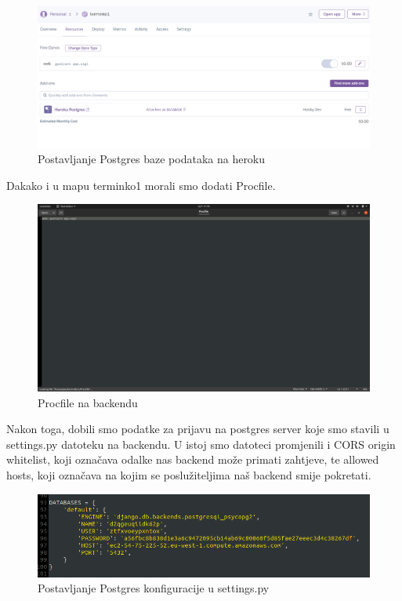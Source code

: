 			\begin{figure}[H]
				\centering
				\includegraphics[scale=0.50]{slike/Postgres.PNG}
				\caption{Postavljanje Postgres baze podataka na heroku}
				\label{fig:promjene}
			\end{figure}
		
			Dakako i u mapu terminko1 morali smo dodati Procfile.
			
			\begin{figure}[H]
				\centering
				\includegraphics[scale=0.25]{slike/ProcFileBackend.PNG}
				\caption{Procfile na backendu}
				\label{fig:promjene}
			\end{figure}
		
			Nakon toga, dobili smo podatke za prijavu na postgres server koje smo stavili u settings.py datoteku na backendu. U istoj smo datoteci promjenili i CORS origin whitelist, koji označava odalke nas backend može primati zahtjeve, te allowed hosts, koji označava na kojim se poslužiteljima naš backend smije pokretati.
			
			\begin{figure}[H]
				\centering
				\includegraphics[scale=0.50]{slike/DatabaseData.PNG}
				\caption{Postavljanje Postgres konfiguracije u settings.py}
				\label{fig:promjene}
			\end{figure}
		
